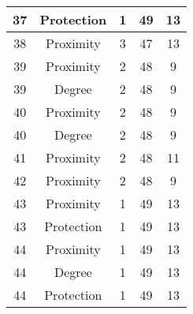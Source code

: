 \documentclass[results.tex]{subfiles}
\begin{document}
\begin{center}
\begin{tabular}{| c || c | c | c | c |}
            \hline
            37                      & Protection                   & 1                      & 49                      & 13                   \\
            \hline
            38                      & Proximity                    & 3                      & 47                      & 13                   \\
            \hline
            39                      & Proximity                    & 2                      & 48                      & 9                    \\
            \hline
            39                      & Degree                       & 2                      & 48                      & 9                    \\
            \hline
            40                      & Proximity                    & 2                      & 48                      & 9                    \\
            \hline
            40                      & Degree                       & 2                      & 48                      & 9                    \\
            \hline
            41                      & Proximity                    & 2                      & 48                      & 11                   \\
            \hline
            42                      & Proximity                    & 2                      & 48                      & 9                    \\
            \hline
            43                      & Proximity                    & 1                      & 49                      & 13                   \\
            \hline
            43                      & Protection                   & 1                      & 49                      & 13                   \\
            \hline
            44                      & Proximity                    & 1                      & 49                      & 13                   \\
            \hline
            44                      & Degree                       & 1                      & 49                      & 13                   \\
            \hline
            44                      & Protection                   & 1                      & 49                      & 13                   \\

\end{tabular}
\end{center}
\end{document}
